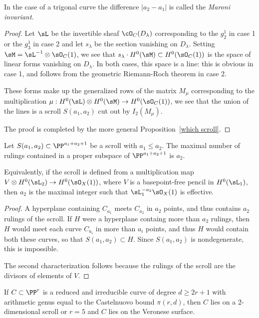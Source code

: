 \begin{remark}
 In the case of a trigonal curve the difference $|a_2-a_1|$ is called the \emph{Maroni invariant}.
\end{remark}
\begin{proof}
Let $\sL$ be the invertible sheaf $\cO_C(D_\lambda)$ corresponding to the $g^1_2$ in case 1 or
the $g_3^1$ in case 2 and let $s_\lambda$ be
the section vanishing on $D_\lambda$. Setting $\sM =  \sL^{-1}\otimes \sO_C(1)$, we see that
$s_\lambda\cdot H^0(\sM) \subset H^0(\sO_C(1))$ is the space of linear forms vanishing on
$D_\lambda$. In both cases, this space is a line: this is obvious in case 1, and follows from the 
geometric Riemann-Roch theorem in case 2. 

These forms make up the
generalized rows of the matrix $M_\mu$ corresponding to the multiplication
$\mu: H^0(\sL)\otimes H^0(\sM) \to H^0(\sO_C(	1))$, we see that the union of the lines is a
scroll $S(a_1,a_2)$ cut out by $I_2(M_\mu)$.

The proof is completed by the more general Proposition~\ref{which scroll}.
\end{proof}

\begin{proposition}\label{which scroll}
Let $S(a_1,a_2)\subset \PP^{a_1+a_2+1}$ be a scroll with $a_1\leq a_2$. The maximal number of rulings contained in
a proper subspace of $ \PP^{a_1+a_2+1}$ is $a_2$. 

Equivalently, if the scroll is defined from a multiplication
map $V\otimes H^0(\sL_2) \to H^0(\sO_X(1))$, where $V$ is a basepoint-free pencil in $H^0(\sL_1)$,
then $a_2$ is the maximal integer such that $\sL_1^{-a_2}\sO_X(1)$ is effective.
\end{proposition}

\begin{proof}
A hyperplane containing $C_{a_1}$ meets $C_{a_2}$ in $a_2$
points, and thus contains $a_2$ rulings of the scroll. If $H$ were a hyperplane containg more than $a_2$
rulings, then $H$ would meet each curve $C_{a_i}$ in more than $a_i$ points, and thus $H$ would contain
both these curves, so that $S(a_1,a_2)\subset H$. Since $S(a_1,a_2)$ is nondegenerate, this is impossible.

The second characterization follows because the rulings of the scroll are the divisors of elements of $V.$
\end{proof}



\begin{theorem}\label{Castelnuovo examples}
If $C\subset \PP^r$ is a reduced and irreducible curve of degree $d\geq 2r+1$ with arithmetic genus equal to
the
Castelnuovo bound $\pi(r,d)$, then $C$ lies on a 2-dimensional scroll or $r=5$ and $C$ lies on  the Veronese surface.
\end{theorem}

